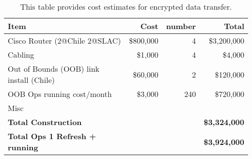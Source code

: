 \tiny \begin{longtable} {|l|r|r|r|} \caption{This table provides cost estimates for encrypted data transfer. \label{tab:ipsec}}\\ 
\hline 
\textbf{Item}&\textbf{Cost}&\textbf{number}&\textbf{Total} \\ \hline
{Cisco Router (2@Chile 2@SLAC)}&{\$800,000}&{4}&{\$3,200,000} \\ \hline
{Cabling}&{\$1,000}&{4}&{\$4,000} \\ \hline
{Out of Bounds (OOB) link  install (Chile)}&{\$60,000}&{2}&{\$120,000} \\ \hline
{OOB Ops running cost/month}&{\$3,000}&{240}&{\$720,000} \\ \hline
{Misc}&{}&{ }&{ } \\ \hline
\textbf{Total Construction}&\textbf{}&\textbf{}&\textbf{\$3,324,000} \\ \hline
\textbf{Total Ops 1 Refresh  + running }&\textbf{}&\textbf{}&\textbf{\$3,924,000} \\ \hline
\end{longtable} \normalsize
